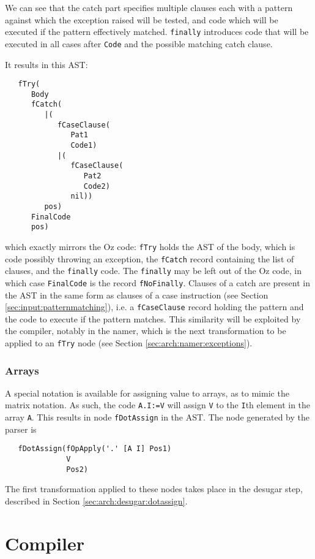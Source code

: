 \documentclass[a4paper]{memoir}
\begin{document}
We can see that the catch part specifies multiple clauses each with a pattern
against which the exception raised will be tested, and code which will be
executed if the pattern effectively matched. \lstinline!finally! introduces code
that will be executed in all cases after \lstinline!Code! and the possible
matching catch clause.

It results in this AST:
\begin{lstlisting}
   fTry(
      Body
      fCatch(
         |(
            fCaseClause(
               Pat1
               Code1)
            |(
               fCaseClause(
                  Pat2
                  Code2)
               nil))
         pos)
      FinalCode
      pos)
\end{lstlisting}

which exactly mirrors the Oz code: \lstinline!fTry! holds the AST of the body,
which is code possibly throwing an exception, the \lstinline!fCatch! record containing the list of
clauses, and the \lstinline!finally! code. The \lstinline!finally! may be left
out of the Oz code, in which case \lstinline!FinalCode! is the record
\lstinline!fNoFinally!.
Clauses of a catch are present in the AST in the same form as clauses of a case
instruction (see Section \ref{sec:input:patternmatching}), i.e. a
\lstinline!fCaseClause! record holding the pattern and the code to execute if
the pattern matches. This similarity will be exploited by the compiler, notably
in the namer, which is the next transformation to be applied to an
\lstinline!fTry! node (see Section \ref{sec:arch:namer:exceptions}).
\subsection{Arrays}
A special notation is available for assigning value to arrays, as to mimic the
matrix notation. As such, the code \lstinline!A.I:=V! will assign \lstinline!V!
to the \lstinline!I!th element in the array \lstinline!A!.
This results in node \lstinline!fDotAssign! in the AST. The node generated by
the parser is
\begin{lstlisting}
   fDotAssign(fOpApply('.' [A I] Pos1) 
              V 
              Pos2) 
\end{lstlisting}
The first transformation applied to these nodes takes place in the desugar step,
described in Section \ref{sec:arch:desugar:dotassign}.
\chapter{Compiler}
\end{document}
